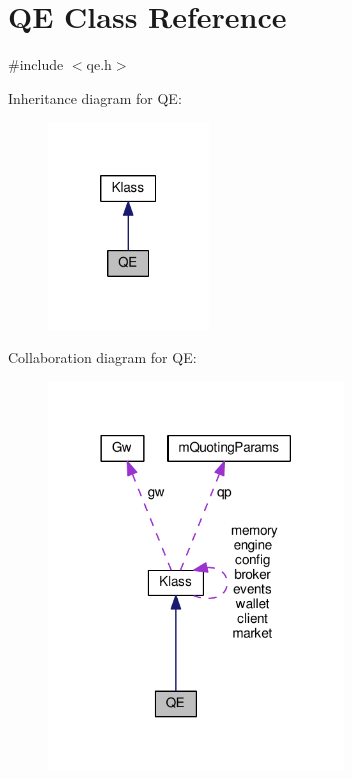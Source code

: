 \hypertarget{class_k_1_1_q_e}{}\section{QE Class Reference}
\label{class_k_1_1_q_e}


{\ttfamily \#include $<$qe.\+h$>$}



Inheritance diagram for QE\+:
\nopagebreak
\begin{figure}[H]
\begin{center}
\leavevmode
\includegraphics[width=121pt]{class_k_1_1_q_e__inherit__graph}
\end{center}
\end{figure}


Collaboration diagram for QE\+:
\nopagebreak
\begin{figure}[H]
\begin{center}
\leavevmode
\includegraphics[width=222pt]{class_k_1_1_q_e__coll__graph}
\end{center}
\end{figure}
